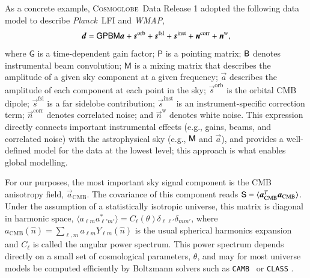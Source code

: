 \documentclass[twocolumn]{../common/aa}
\def\WMAP{\emph{WMAP}}
\def\Planck{\emph{Planck}}
\def\camb{\texttt{CAMB}}
\renewcommand{\d}[0]{\vec{d}}
\newcommand{\B}[0]{\tens{B}}
\renewcommand{\G}[0]{\tens{G}}
\newcommand{\n}[0]{\vec{n}}
\newcommand{\s}[0]{\vec{s}}
\renewcommand{\a}[0]{\vec{a}}
\newcommand{\M}[0]{\tens{M}}
\renewcommand{\S}[0]{\tens{S}}
\renewcommand{\P}[0]{\tens{P}}
\newcommand{\cosmoglobe}{\textsc{Cosmoglobe}}
\begin{document}
As a concrete example, \cosmoglobe\ Data Release 1 \citep{watts2023_dr1} adopted the following data model to describe \Planck\ LFI and \WMAP,
\begin{equation}
	\label{eq:model}
	\d =\G\P\B\M\a+ \s^\mathrm{orb}
	+\s^\mathrm{fsl} + \s^\mathrm{inst}+ \n^\mathrm{corr}+\n^\mathrm{w},
\end{equation}
where $\mathsf G$ is a time-dependent gain factor; $\mathsf P$ is a pointing matrix;
$\B$ denotes instrumental beam convolution; $\mathsf M$ is a mixing matrix that describes the amplitude of a given sky component at a given frequency; $\a$ describes the amplitude of each component at each point in the sky; $\s^\mathrm{orb}$ is the orbital CMB dipole; $\s^\mathrm{fsl}$ is a far sidelobe contribution; $\s^\mathrm{inst}$ is an instrument-specific correction term; $\n^\mathrm{corr}$ denotes correlated noise; and $\n^\mathrm{w}$ denotes white noise. This expression directly connects important instrumental effects (e.g., gains, beams, and correlated noise) with the astrophysical sky (e.g., $\M$ and $\a$), and provides a well-defined model for the data at the lowest level; this approach is what enables global modelling.

For our purposes, the most important sky signal component is the CMB anisotropy field, $\a_{\mathrm{CMB}}$. The covariance of this component reads $\S = \langle \a_{\mathrm{CMB}}^T \a_{\mathrm{CMB}}\rangle$. Under the assumption of a statistically isotropic universe, this matrix is diagonal in harmonic space, $\langle a_{\ell m} a^*_{\ell' m'}\rangle = C_{\ell}(\theta) \delta_{\ell\ell'}\delta_{mm'}$, where $a_{\mathrm{CMB}}(\hat{n}) = \sum_{\ell,m} a_{\ell m} Y_{\ell m}(\hat{n})$ is the usual spherical harmonics expansion and $C_{\ell}$ is called the angular power spectrum. This power spectrum depends directly on a small set of cosmological parameters, $\theta$, and may for most universe models be computed efficiently by Boltzmann solvers such as \camb\ \citep{Lewis:1999bs} or \texttt{CLASS} \citep{lesgourgues:2011}.
\end{document}
